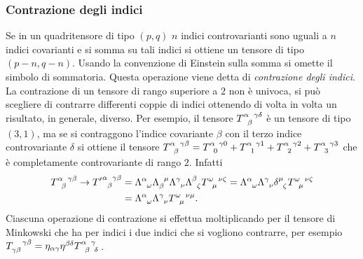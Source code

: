 \subsubsection{Contrazione degli indici}
\label{sec:contrazione-indice-minkowski}

Se in un quadritensore di tipo $(p,q)$ $n$ indici controvarianti sono uguali a
$n$ indici covarianti e si somma su tali indici si ottiene un tensore di tipo
$(p-n,q-n)$.  Usando la convenzione di Einstein sulla somma si omette il simbolo
di sommatoria.  Questa operazione viene detta di
\emph{contrazione degli indici}.  La contrazione
di un tensore di rango superiore a $2$ non è univoca, si può scegliere di
contrarre differenti coppie di indici ottenendo di volta in volta un risultato,
in generale, diverso.  Per esempio, il tensore
$\tensor{T}{^{\alpha}_{\beta}^{\gamma\delta}}$ è un tensore di tipo $(3,1)$, ma
se si contraggono l'indice covariante $\beta$ con il terzo indice controvariante
$\delta$ si ottiene il tensore
$\tensor{T}{^{\alpha}_{\beta}^{\gamma\beta}} =
\tensor{T}{^{\alpha}_{0}^{\gamma 0}} + \tensor{T}{^{\alpha}_{1}^{\gamma 1}} +
\tensor{T}{^{\alpha}_{2}^{\gamma 2}} + \tensor{T}{^{\alpha}_{3}^{\gamma 3}}$
che è completamente controvariante di rango $2$.  Infatti
\begin{equation}
  \begin{split}
    \tensor{T}{^{\alpha}_{\beta}^{\gamma\beta}} \to
    \tensor{{T'}}{^{\alpha}_{\beta}^{\gamma\beta}} &=
    \tensor{\Lambda}{^{\alpha}_{\omega}} \tensor{\Lambda}{_{\beta}^{\mu}}
    \tensor{\Lambda}{^{\gamma}_{\nu}} \tensor{\Lambda}{^{\beta}_{\zeta}}
    \tensor{T}{^{\omega}_{\mu}^{\nu\zeta}} =
    \tensor{\Lambda}{^{\alpha}_{\omega}} \tensor{\Lambda}{^{\gamma}_{\nu}}
    \tensor{\delta}{^{\mu}_{\zeta}} \tensor{T}{^{\omega}_{\mu}^{\nu\zeta}} \\
    &= \tensor{\Lambda}{^{\alpha}_{\omega}} \tensor{\Lambda}{^{\gamma}_{\nu}}
    \tensor{T}{^{\omega}_{\mu}^{\nu\mu}}.
  \end{split}
\end{equation}
Ciascuna operazione di contrazione si effettua moltiplicando per il tensore di
Minkowski che ha per indici i due indici che si vogliono contrarre, per esempio
$\tensor{T}{_{\gamma\beta}^{\gamma\beta}} = \eta_{\alpha\gamma}
\eta^{\beta\delta} \tensor{T}{^{\alpha}_{\beta}^{\gamma}_{\delta}}$.

